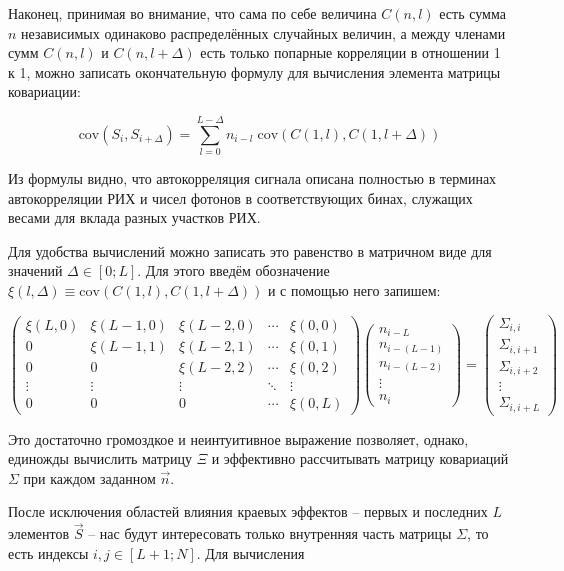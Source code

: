 \documentclass[12pt]{book}
\newcommand{\cov}{\mathrm{cov}}
\begin{document}
	Наконец, принимая во внимание, что сама по себе величина $C(n, l)$ есть сумма $n$ независимых одинаково распределённых случайных величин, а между членами сумм $C(n, l)$ и $C(n, l + \Delta)$ есть только попарные корреляции в отношении 1 к 1, можно записать окончательную формулу для вычисления элемента матрицы ковариации:
	
	\begin{equation}
		\cov(S_i, S_{i + \Delta}) = \sum_{l=0}^{L - \Delta} n_{i-l} \; \cov\left(C(1, l), C(1, l + \Delta)\right)
	\end{equation}

	Из формулы видно, что автокорреляция сигнала описана полностью в терминах автокорреляции РИХ и чисел фотонов в соответствующих бинах, служащих весами для вклада разных участков РИХ.
	
	Для удобства вычислений можно записать это равенство в матричном виде для значений $\Delta \in \left[0; L\right]$. Для этого введём обозначение $\xi(l, \Delta) \equiv \cov\left(C(1, l), C(1, l + \Delta)\right)$ и с помощью него запишем:
	
	\begin{equation}
		\begin{pmatrix} 
			\xi(L, 0) & \xi(L-1, 0) & \xi(L-2, 0) & \dotsm & \xi(0, 0) \\
			     0    & \xi(L-1, 1) & \xi(L-2, 1) & \dotsm & \xi(0, 1) \\
				 0    &      0      & \xi(L-2, 2) & \dotsm & \xi(0, 2) \\
			   \vdots &   \vdots    &    \vdots   & \ddots &   \vdots  \\
			     0    &      0      &      0      & \dotsm & \xi(0, L)
		\end{pmatrix}
		\begin{pmatrix} 
			n_{i-L} \\ n_{i-(L-1)} \\ n_{i-(L-2)} \\ \vdots \\ n_{i}
		\end{pmatrix}
		=
		\begin{pmatrix} 
			\Sigma_{i, i} \\
			\Sigma_{i, i+1} \\ 
			\Sigma_{i, i+2} \\ 
			\vdots \\ 
			\Sigma_{i, i+L}
		\end{pmatrix}
		\label{eq:Xi-matrix-for-Sigma-calculation}
	\end{equation}

	Это достаточно громоздкое и неинтуитивное выражение позволяет, однако, единожды вычислить матрицу $\Xi$ и эффективно рассчитывать матрицу ковариаций $\Sigma$ при каждом заданном $\vec{n}$.
	
	После исключения областей влияния краевых эффектов -- первых и последних $L$ элементов $\vec{S}$ -- нас будут интересовать только внутренняя часть матрицы $\Sigma$, то есть индексы $i, j \in [L + 1; N]$. Для вычисления 

	\printbibliography
	
\end{document}
